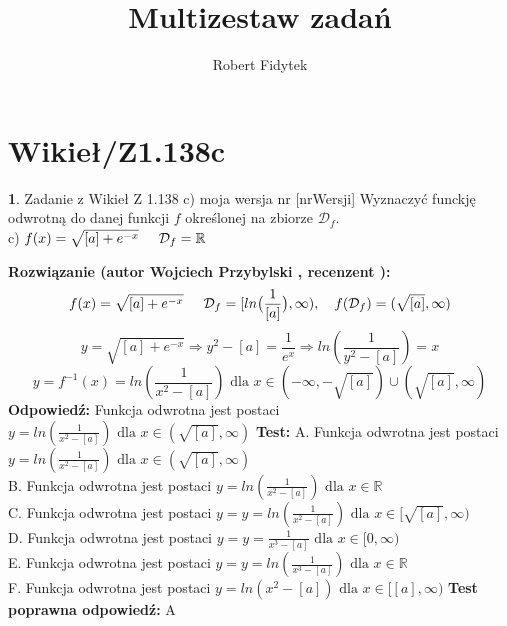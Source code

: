 \documentclass[12pt, a4paper]{article}
\title{Multizestaw zadań}
\author{Robert Fidytek}
\date{}
\theoremstyle{definition} %
\newtheorem{zad}{}
\newcommand{\kategoria}[1]{\section{#1}} %
\newcommand{\zadStart}[1]{\begin{zad}#1\newline} %
\newcommand{\zadStop}{\end{zad}}   %
\newcommand{\rozwStart}[2]{\noindent \textbf{Rozwiązanie (autor #1 , recenzent #2): }\newline} %
\newcommand{\rozwStop}{\newline}                                            %
\newcommand{\odpStart}{\noindent \textbf{Odpowiedź:}\newline}    %
\newcommand{\odpStop}{\newline}                                             %
\newcommand{\testStart}{\noindent \textbf{Test:}\newline} %
\newcommand{\testStop}{\newline} %
\newcommand{\kluczStart}{\noindent \textbf{Test poprawna odpowiedź:}\newline} %
\newcommand{\kluczStop}{\newline} %
\begin{document}
\maketitle


\kategoria{Wikieł/Z1.138c}
\zadStart{Zadanie z Wikieł Z 1.138 c) moja wersja nr [nrWersji]}
Wyznaczyć funckję odwrotną do danej funkcji $f$ określonej na zbiorze $\mathcal{D}_{f}$.\\
c) $f(x)=\sqrt{[a]+e^{-x}}\hspace{5mm}\mathcal{D}_{f}=\mathbb{R}$
\zadStop
\rozwStart{Wojciech Przybylski}{}
$$f(x)=\sqrt{[a]+e^{-x}}\hspace{5mm} \mathcal{D}_{f}=[ln\big(\frac{1}{[a]}\big),\infty),\quad f(\mathcal{D}_{f})=(\sqrt{[a]},\infty)$$
$$y=\sqrt{[a]+e^{-x}} \Rightarrow y^{2}-[a]=\frac{1}{e^{x}} \Rightarrow ln(\frac{1}{y^{2}-[a]})=x$$
$$y=f^{-1}(x)=ln(\frac{1}{x^{2}-[a]}) \mbox{ dla } x\in (-\infty,-\sqrt{[a]})\cup (\sqrt{[a]},\infty) $$
\rozwStop
\odpStart
Funkcja odwrotna jest postaci $y=ln(\frac{1}{x^{2}-[a]}) \mbox{ dla }x\in (\sqrt{[a]},\infty)$
\odpStop
\testStart
A. Funkcja odwrotna jest postaci $y=ln(\frac{1}{x^{2}-[a]}) \mbox{ dla }x\in(\sqrt{[a]},\infty)$\\
B. Funkcja odwrotna jest postaci $y=ln(\frac{1}{x^{2}-[a]}) \mbox{ dla }x\in\mathbb{R}$\\
C. Funkcja odwrotna jest postaci $y=y=ln(\frac{1}{x^{2}-[a]}) \mbox{ dla }x\in[\sqrt{[a]},\infty)$\\
D. Funkcja odwrotna jest postaci $y=y=\frac{1}{x^{3}-[a]} \mbox{ dla }x\in[0,\infty)$\\
E. Funkcja odwrotna jest postaci $y=y=ln(\frac{1}{x^{3}-[a]}) \mbox{ dla }x\in \mathbb{R}$\\
F. Funkcja odwrotna jest postaci $y=ln(x^{2}-[a])\mbox{ dla }x\in[[a],\infty)$
\testStop
\kluczStart
A
\kluczStop
\end{document}
